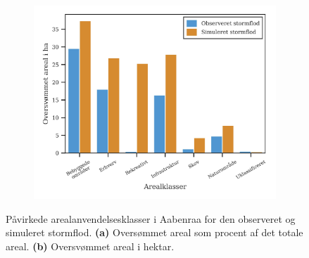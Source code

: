 \begin{figure}[H]
\begin{subfigure}[t]{0.5\textwidth}
        \includegraphics[width=1\linewidth]{images/Resultater/areal_anvendelses_grafer/aabenraa_oversvommet_Hektar.jpg}
        \caption{}
        \label{Subfig: Hektar arealklasser Aabenraa}
    \end{subfigure}
    \caption{Påvirkede arealanvendelsesklasser i Aabenraa for den observeret og simuleret stormflod. \textbf{(a)} Oversømmet areal som procent af det totale areal. \textbf{(b)} Oversvømmet areal i hektar.}
    \label{Figur: Påvirket arealanvendelse Aabenraa}
\end{figure}
  

